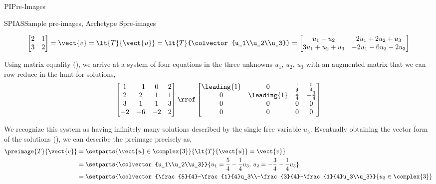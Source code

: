 \begin{subsect}{PI}{Pre-Images}
\begin{example}{SPIAS}{Sample pre-images, Archetype S}{pre-images}
\begin{para}
%
\begin{equation*}
\begin{bmatrix}
2&1\\3&2
\end{bmatrix}
=\vect{v}
=\lt{T}{\vect{u}}
=\lt{T}{\colvector{u_1\\u_2\\u_3}}\\
=\begin{bmatrix}
u_1-u_2&2u_1+2u_2+u_3\\
3u_1+u_2+u_3&-2u_1-6u_2-2u_3
\end{bmatrix}
\end{equation*}
\end{para}
%
\begin{para}Using matrix equality (), we arrive at a system of four equations in the three unknowns $u_1,\,u_2,\,u_3$ with an augmented matrix that we can row-reduce in the hunt for solutions,
%
\begin{equation*}
\begin{bmatrix}
1 & -1 & 0 & 2\\
2 & 2 & 1 & 1\\
3 & 1 & 1 & 3\\
-2 & -6 & -2 & 2
\end{bmatrix}
\rref
\begin{bmatrix}
\leading{1} & 0 & \frac{1}{4} &  \frac{5}{4}\\
0 & \leading{1} & \frac{1}{4} &  -\frac{3}{4}\\
0 & 0 & 0 &  0\\
0 & 0 & 0 &  0
\end{bmatrix}
\end{equation*}
\end{para}
%
\begin{para}We recognize this system as having infinitely many solutions described by the single free variable $u_3$.  Eventually obtaining the vector form of the solutions (), we can describe the preimage precisely as,
%
\begin{align*}
\preimage{T}{\vect{v}}&=\setparts{\vect{u}\in\complex{3}}{\lt{T}{\vect{u}}=\vect{v}}\\
&=\setparts{\colvector{u_1\\u_2\\u_3}}{u_1=\frac{5}{4}-\frac{1}{4}u_3,\,u_2=-\frac{3}{4}-\frac{1}{4}u_3}\\
&=\setparts{\colvector{\frac{5}{4}-\frac{1}{4}u_3\\-\frac{3}{4}-\frac{1}{4}u_3\\u_3}}{u_3\in\complex{3}}\\

\end{align*}
\end{para}
\end{example}
\end{subsect}
